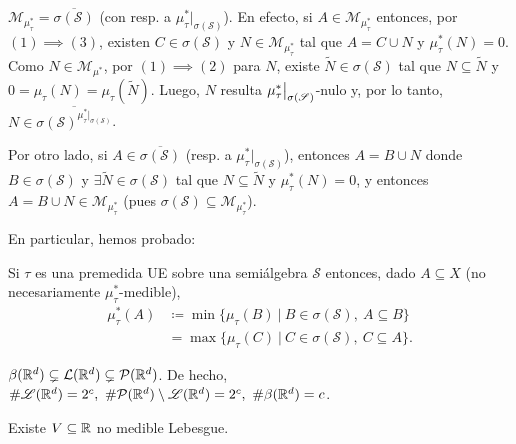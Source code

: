 \begin{observe}
	$\mathscr{M}_{\mu_{\tau}^{*}} = \overline{\sigma(\mathscr{S})}$ (con resp. a $\mu_{\tau}^{*}|_{\sigma(\mathscr{S})}$). En efecto, si $A \in \mathscr{M}_{\mu_{\tau}^{*}}$ entonces, por $(1) \implies (3)$, existen $C \in \sigma(\mathscr{S})$ y $N \in \mathscr{M}_{\mu_{\tau}^{*}}$ tal que $A = C \cup N$ y $\mu_{\tau}^{*}(N) = 0$. Como $N \in \mathscr{M}_{\mu^{*}}$, por $(1) \implies (2)$ para $N$, existe $\widetilde{N} \in \sigma(\mathscr{S})$ tal que $N \subseteq \widetilde{N}$ y $0 = \mu_{\tau}(N) = \mu_{\tau}(\widetilde{N})$. Luego, $N$ resulta $\mu_{\tau}^{*}\big{|}_{\sigma(\mathscr{S})}$-nulo y, por lo tanto, $N \in \overline{\sigma(\mathscr{S})^{\mu_{\tau}^{*}|_{\sigma(\mathscr{S})}}}$. \par
	\medskip
	Por otro lado, si $A \in \overline{\sigma(\mathscr{S})}$ (resp. a $\mu_{\tau}^{*}|_{\sigma(\mathscr{S})}$), entonces $A = B \cup N$ donde $B \in \sigma(\mathscr{S})$ y $\exists \widetilde{N} \in \sigma(\mathscr{S})$ tal que $N \subseteq \widetilde{N}$ y $\mu_{\tau}^{*}(N) = 0$, y entonces $A = B \cup N \in \mathscr{M}_{\mu_{\tau}^{*}}$ (pues $\sigma(\mathscr{S}) \subseteq \mathscr{M}_{\mu_{\tau}^{*}}$).
\end{observe}

\begin{observe}
	En particular, hemos probado:
\end{observe}

\begin{prop}
	Si $\tau$ es una premedida UE sobre una semiálgebra $\mathscr{S}$ entonces, dado $A \subseteq X$ (no necesariamente $\mu_{\tau}^{*}$-medible),
	\begin{align*}
		\mu_{\tau}^{*}(A) & \coloneq \min \{ \mu_{\tau}(B) \ \big| \ B \in \sigma(\mathscr{S}),\ A \subseteq B \} \\
		& = \max \{ \mu_{\tau}(C) \ \big| \ C \in \sigma(\mathscr{S}),\ C \subseteq A \}  
	.\end{align*}
\end{prop}

\begin{theorem}
	$\beta(\mathbb{R}^d) \subsetneq \mathcal{L}(\mathbb{R}^d) \subsetneq \mathcal{P}(\mathbb{R}^d)$. De hecho, $\# \mathscr{L}(\mathbb{R}^d) = 2^c,\ \# \mathcal{P}(\mathbb{R}^d) \setminus \mathscr{L}(\mathbb{R}^d) = 2^c,\ \# \beta(\mathbb{R}^d) = c$.
\end{theorem}

\begin{theorem}
	Existe $V \subseteq \mathbb{R}$ no medible Lebesgue.
\end{theorem}

